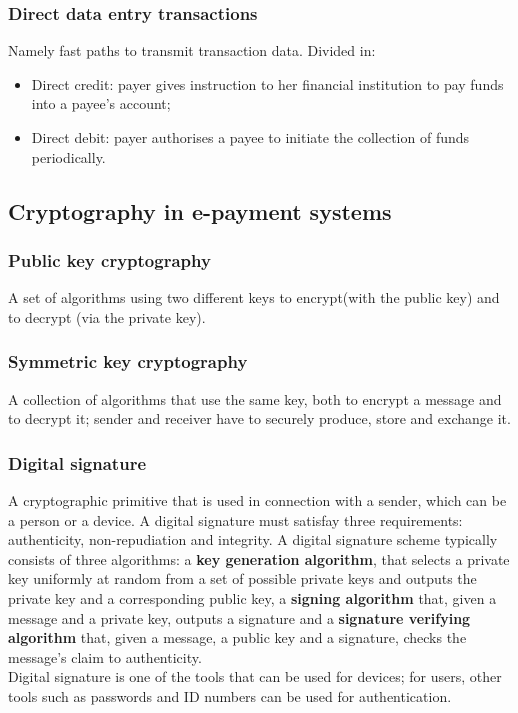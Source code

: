 \documentclass[a4paper, 10pt, titlepage]{article}
\begin{document}
\subsubsection*{Direct data entry transactions} 
Namely fast paths to transmit transaction data. Divided in:
\begin{itemize}
\item Direct credit: payer gives instruction to her financial institution to pay funds into a payee's account;
\item Direct debit: payer authorises a payee to initiate the collection of funds periodically.
\end{itemize}

\subsection{Cryptography in e-payment systems}
\subsubsection*{Public key cryptography}
A set of algorithms using two different keys to encrypt(with the public key) and to decrypt (via the private key).
\subsubsection*{Symmetric key cryptography}
A collection of algorithms that use the same key, both to encrypt a message and to decrypt it; sender and receiver have to securely produce, store and exchange it.
\subsubsection*{Digital signature}
A cryptographic primitive that is used in connection with a sender, which can be a person or a device. A digital signature must satisfay three requirements: authenticity, non-repudiation and integrity.
A digital signature scheme typically consists of three algorithms:
a \textbf{key generation algorithm}, that selects a private key uniformly at random from a set of possible private keys and outputs the private key and a corresponding public key, a \textbf{signing algorithm} that, given a message and a private key, outputs a signature and a \textbf{signature verifying algorithm} that, given a message, a public key and a signature, checks the message's claim to authenticity.\\
Digital signature is one of the tools that can be used for devices; for users, other tools such as passwords and ID numbers can be used for authentication.
\end{document}
